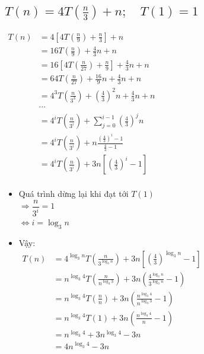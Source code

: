 \documentclass[12pt, letterpaper]{article}
\begin{document}
\subsection{$ T(n) = 4T(\frac{n}{3}) + n; \quad T(1) = 1 $}
$ \begin{aligned}
    T(n) &= 4[4T(\frac{n}{9}) + \frac{n}{3}] + n \\
        &= 16T(\frac{n}{9}) + \frac{4}{3}n + n \\
        &= 16[4T(\frac{n}{27}) + \frac{n}{9}] + \frac{4}{3}n + n \\
        &= 64T(\frac{n}{27}) + \frac{16}{9}n + \frac{4}{3}n + n \\
        &= 4^3T(\frac{n}{3^3}) + {(\frac{4}{3})}^2n + \frac{4}{3}n + n \\
        &\cdots \\
        &= 4^{i}T(\frac{n}{3^i}) + \sum_{j = 0}^{i - 1}{(\frac{4}{3})}^j n \\
        &= 4^{i}T(\frac{n}{3^i}) + n \frac{{(\frac{4}{3})}^i - 1}{\frac{4}{3} - 1}\\
        &= 4^{i}T(\frac{n}{3^i}) + 3n[{(\frac{4}{3})}^i - 1] \\
\end{aligned} $

\begin{itemize}[label=-]
    \item Quá trình dừng lại khi đạt tới $ T(1) $ \\
        $ \Rightarrow \dfrac{n}{3^i} = 1 $ \\
        $ \Leftrightarrow i = \log_3n $
    \item Vậy:\\
        $ \begin{aligned}
            T(n) &= 4^{\log_3n} T(\frac{n}{3^{\log_3n}}) + 3n[{(\frac{4}{3})}^{\log_3n} - 1] \\
                &= n^{\log_3 4} T(\frac{n}{n^{\log_3 3}}) + 3n(\frac{4^{\log_3 n}}{3^{\log_3 n}} - 1) \\
                &= n^{\log_3 4} T(\frac{n}{n}) + 3n(\frac{n^{\log_3 4}}{n^{\log_3 3}} - 1) \\
                &= n^{\log_3 4} T(1) + 3n(\frac{n^{\log_3 4}}{n} - 1) \\
                &= n^{\log_3 4} + 3n^{\log_3 4} - 3n \\
                &= 4n^{\log_3 4} - 3n \\
        \end{aligned} $
\end{itemize}
\end{document}
